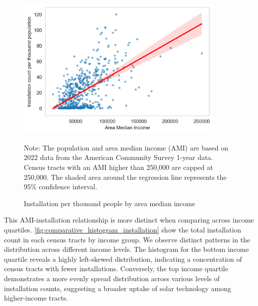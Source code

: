 \documentclass[11pt,twoside,letterpaper]{article}
\begin{document}
\begin{figure}[h]
    \centering
\includegraphics[width=0.9\textwidth]{figures/population_ami_count.png}
    \caption{Installation per thousand people by area median income}
    \label{fig:population_ami_count}
        \begin{flushleft}
        \footnotesize Note: The population and area median income (AMI) are based on 2022 data from the American Community Survey 1-year data. Census tracts with an AMI higher than 250,000 are capped at 250,000. The shaded area around the regression line represents the 95\% confidence interval.
    \end{flushleft}
\end{figure}

This AMI-installation relationship is more distinct when comparing across income quartiles. \autoref{fig:comparative_histogram_installation} show the total installation count in each census tracts by income group. We observe distinct patterns in the distribution across different income levels. The histogram for the bottom income quartile reveals a highly left-skewed distribution, indicating a concentration of census tracts with fewer installations. Conversely, the top income quartile demonstrates a more evenly spread distribution across various levels of installation counts, suggesting a broader uptake of solar technology among higher-income tracts.
\end{document}
